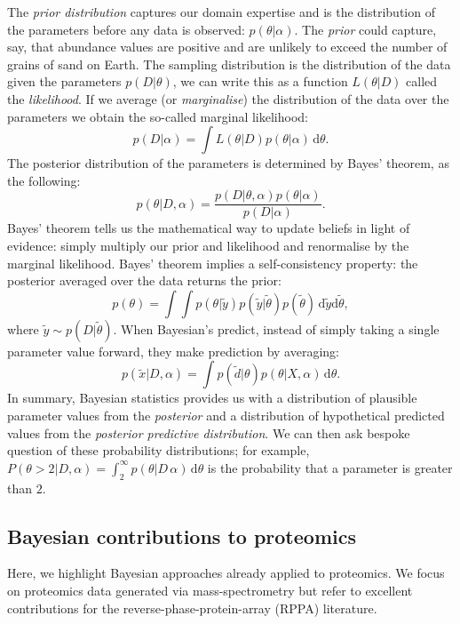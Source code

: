 \documentclass[12pt,english]{article}
\begin{document}
The \textit{prior distribution} captures our domain expertise and is the distribution of the parameters before any data is observed: $p(\theta|\alpha)$. The \textit{prior} could capture, say, that abundance values are positive and are unlikely to exceed the number of grains of sand on Earth. The sampling distribution is the distribution of the data given the parameters $p(D|\theta)$, we can write this as a function $L(\theta|D)$ called the \textit{likelihood}. If we average (or \textit{marginalise}) the distribution of the data over the parameters we obtain the so-called marginal likelihood:
\begin{equation}
p(D|\alpha) = \int L(\theta|D)p(\theta|\alpha)\,\text{d}\theta.
\end{equation}
The posterior distribution of the parameters is determined by Bayes' theorem, as the following:
\begin{equation}
p(\theta|D, \alpha) = \frac{p(D|\theta, \alpha)p(\theta|\alpha)}{p(D|\alpha)}.
\end{equation}
Bayes' theorem tells us the mathematical way to update beliefs in light of evidence: simply multiply our prior and likelihood and renormalise by the marginal likelihood. Bayes' theorem implies a self-consistency property: the posterior averaged over the data returns the prior:
\begin{equation}
p(\theta) = \int \int p(\theta|\tilde{y})p(\tilde{y}|\tilde{\theta})p(\tilde{\theta})\,\text{d}\tilde{y}\text{d}\tilde{\theta},
\end{equation}
where $\tilde{y} \sim p(D|\tilde{\theta})$. When Bayesian's predict, instead of simply taking a single parameter value forward, they make prediction by averaging:
\begin{equation}
p(\tilde{x}|D,\alpha) = \int p(\tilde{d}|\theta)p(\theta|X,\alpha)\,\text{d}\theta.
\end{equation}
In summary, Bayesian statistics provides us with a distribution of plausible parameter values from the \textit{posterior} and a distribution of hypothetical predicted values from the \textit{posterior predictive distribution}. We can then ask bespoke question of these probability distributions; for example, $P(\theta > 2|D, \alpha) = \int_{2}^{\infty}p(\theta|D\,\alpha)\,\text{d}\theta$ is the probability that a parameter is greater than $2$. 

\subsection{Bayesian contributions to proteomics}
Here, we highlight Bayesian approaches already applied to proteomics. We focus on proteomics data generated via mass-spectrometry but refer to excellent contributions for the reverse-phase-protein-array (RPPA) literature.
	
\end{document}
